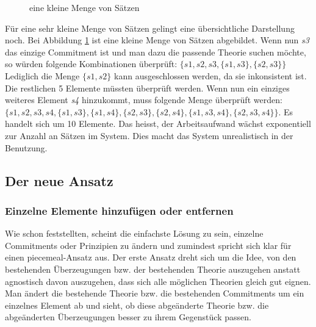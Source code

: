 \documentclass{article}
\begin{document}
\begin{figure}[htbp]
  \centering
  
  \caption{eine kleine Menge von Sätzen\label{fig:smallset}}
\end{figure}

Für eine sehr kleine Menge von Sätzen gelingt eine übersichtliche Darstellung noch. Bei Abbildung \ref{fig:smallset} ist eine kleine Menge von Sätzen abgebildet. Wenn nun \textit{s3} das einzige Commitment ist und man dazu die passende Theorie suchen möchte, so würden folgende Kombinationen überprüft: $\{s1, s2, s3, \{s1,s3\}, \{s2,s3\}\}$ Lediglich die Menge $\{s1,s2\}$ kann ausgeschlossen werden, da sie inkonsistent ist. Die restlichen 5 Elemente müssten überprüft werden. Wenn nun ein einziges weiteres Element \textit{s4} hinzukommt, muss folgende Menge überprüft werden:\linebreak
$\{s1, s2, s3, s4, \{s1,s3\}, \{s1,s4\}, \{s2,s3\}, \{s2,s4\}, \{s1,s3,s4\}, \{s2,s3,s4\}\}$. Es handelt sich um 10 Elemente. Das heisst, der Arbeitsaufwand wächst exponentiell zur Anzahl an Sätzen im System. Dies macht das System unrealistisch in der Benutzung.



\subsection{Der neue Ansatz}

\subsubsection{Einzelne Elemente hinzufügen oder entfernen}
Wie \cite[S.25]{beisbart_making_2015} schon feststellten, scheint die einfachste Lösung zu sein, einzelne Commitments oder Prinzipien zu ändern und zumindest \citeauthor{goodman_fact_1983} spricht sich klar für einen piecemeal-Ansatz aus. Der erste Ansatz dreht sich um die Idee, von den bestehenden Überzeugungen bzw. der bestehenden Theorie auszugehen anstatt agnostisch davon auszugehen, dass sich alle möglichen Theorien gleich gut eignen. Man ändert die bestehende Theorie bzw. die bestehenden Commitments um ein einzelnes Element ab und sieht, ob diese abgeänderte Theorie bzw. die abgeänderten Überzeugungen besser zu ihrem Gegenstück passen.
\end{document}
